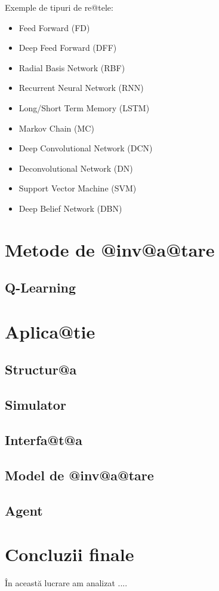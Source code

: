 Exemple de tipuri de re@tele:

\begin{itemize}
	\item Feed Forward (FD)
	\item Deep Feed Forward (DFF)
	\item Radial Basis Network (RBF)
	\item Recurrent Neural Network (RNN)
	\item Long/Short Term Memory (LSTM)
	\item Markov Chain (MC)
	\item Deep Convolutional Network (DCN)
	\item Deconvolutional Network (DN)
	\item Support Vector Machine (SVM)
	\item Deep Belief Network (DBN)
\end{itemize}

\chapter{Metode de @inv@a@tare}

\section{Q-Learning}

\chapter{Aplica@tie}
\section{Structur@a}



\section{Simulator}

\section{Interfa@t@a}

\section{Model de @inv@a@tare}

\section{Agent}




\chapter*{Concluzii finale}



\^ In aceast\u a lucrare am analizat ....
